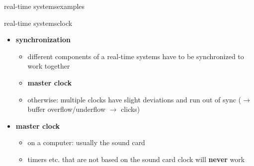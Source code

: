 	\begin{frame}{real-time systems}{examples}
	\end{frame}

	\begin{frame}{real-time systems}{clock}
        \begin{itemize}
            \item   \textbf{synchronization}
                \begin{itemize}
                    \item different components of a real-time systems have to be synchronized to work together
                    \item<2->[$\Rightarrow$] \textbf{master clock}
                    \smallskip
                    \item<3-> otherwise: multiple clocks have slight deviations and run out of sync ($\rightarrow$ buffer overflow/underflow $\rightarrow$ clicks)
                \end{itemize}
            
            \bigskip
            \item<4->   \textbf{master clock}
                \begin{itemize}
                    \item   on a computer: usually the sound card
                    \item   timers etc. that are not based on the sound card clock will \textbf{never} work
                \end{itemize}
           \end{itemize}
	\end{frame}
    
